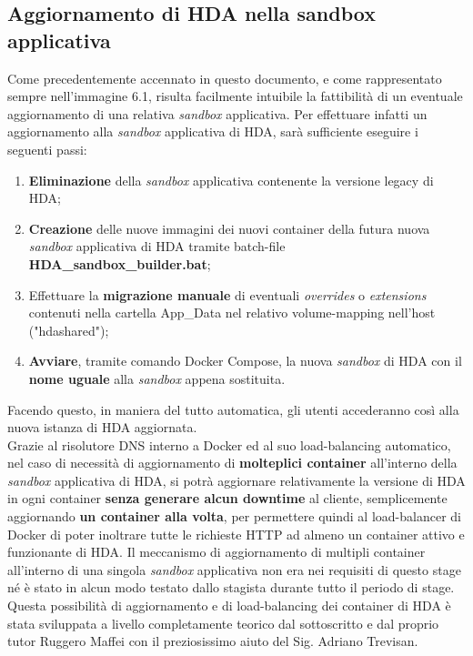 \subsection{Aggiornamento di HDA nella sandbox applicativa}
Come precedentemente accennato in questo documento, e come rappresentato sempre nell'immagine 6.1, risulta facilmente intuibile la fattibilità di un eventuale aggiornamento di una relativa \textit{sandbox} applicativa. Per effettuare infatti un aggiornamento alla \textit{sandbox} applicativa di HDA, sarà sufficiente eseguire i seguenti passi:
\begin{enumerate}
	\item \textbf{Eliminazione} della \textit{sandbox} applicativa contenente la versione legacy di HDA;
	\item \textbf{Creazione} delle nuove immagini dei nuovi container della futura nuova \textit{sandbox} applicativa di HDA tramite batch-file \textbf{HDA\_sandbox\_builder.bat};
	\item Effettuare la \textbf{migrazione manuale} di eventuali \textit{overrides} o \textit{extensions} contenuti nella cartella App\_Data nel relativo volume-mapping nell'host ("hdashared");
	\item \textbf{Avviare}, tramite comando Docker Compose, la nuova \textit{sandbox} di HDA con il \textbf{nome uguale} alla \textit{sandbox} appena sostituita.
\end{enumerate}

Facendo questo, in maniera del tutto automatica, gli utenti accederanno così alla nuova istanza di HDA aggiornata.\\

Grazie al risolutore DNS interno a Docker ed al suo load-balancing automatico, nel caso di necessità di aggiornamento di \textbf{molteplici container} all'interno della \textit{sandbox} applicativa di HDA, si potrà aggiornare relativamente la versione di HDA in ogni container \textbf{senza generare alcun downtime} al cliente, semplicemente aggiornando \textbf{un container alla volta}, per permettere quindi al load-balancer di Docker di poter inoltrare tutte le richieste HTTP ad almeno un container attivo e funzionante di HDA. Il meccanismo di aggiornamento di multipli container all'interno di una singola \textit{sandbox} applicativa non era nei requisiti di questo stage né è stato in alcun modo testato dallo stagista durante tutto il periodo di stage. Questa possibilità di aggiornamento e di load-balancing dei container di HDA è stata sviluppata a livello completamente teorico dal sottoscritto e dal proprio tutor Ruggero Maffei con il preziosissimo aiuto del Sig. Adriano Trevisan.

